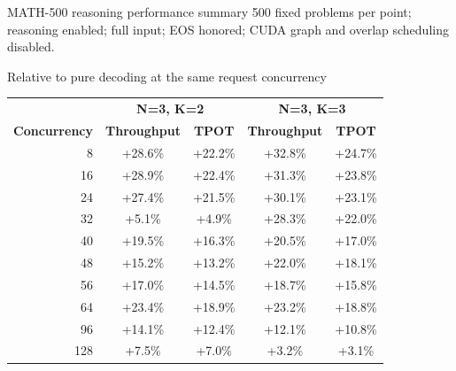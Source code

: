 \documentclass[aspectratio=169]{beamer}
\begin{document}
\begin{frame}{MATH-500 reasoning performance summary}
  \centering
  {\small 500 fixed problems per point; reasoning enabled; full input; EOS honored;
  CUDA graph and overlap scheduling disabled.}

  \vspace{0.08cm}
  {\scriptsize Relative to pure decoding at the same request concurrency
  \renewcommand{\arraystretch}{1.03}
  \begin{tabular}{rcc|cc}
    \hline
    & \multicolumn{2}{c|}{\textbf{N=3, K=2}} &
      \multicolumn{2}{c}{\textbf{N=3, K=3}} \\
    \textbf{Concurrency} & \textbf{Throughput} & \textbf{TPOT} &
      \textbf{Throughput} & \textbf{TPOT} \\
    \hline
    8   & \textcolor{green!45!black}{+28.6\%} & \textcolor{green!45!black}{+22.2\%} & \textcolor{green!45!black}{+32.8\%} & \textcolor{green!45!black}{+24.7\%} \\
    16  & \textcolor{green!45!black}{+28.9\%} & \textcolor{green!45!black}{+22.4\%} & \textcolor{green!45!black}{+31.3\%} & \textcolor{green!45!black}{+23.8\%} \\
    24  & \textcolor{green!45!black}{+27.4\%} & \textcolor{green!45!black}{+21.5\%} & \textcolor{green!45!black}{+30.1\%} & \textcolor{green!45!black}{+23.1\%} \\
    32  & \textcolor{green!45!black}{+5.1\%}  & \textcolor{green!45!black}{+4.9\%}  & \textcolor{green!45!black}{+28.3\%} & \textcolor{green!45!black}{+22.0\%} \\
    40  & \textcolor{green!45!black}{+19.5\%} & \textcolor{green!45!black}{+16.3\%} & \textcolor{green!45!black}{+20.5\%} & \textcolor{green!45!black}{+17.0\%} \\
    48  & \textcolor{green!45!black}{+15.2\%} & \textcolor{green!45!black}{+13.2\%} & \textcolor{green!45!black}{+22.0\%} & \textcolor{green!45!black}{+18.1\%} \\
    56  & \textcolor{green!45!black}{+17.0\%} & \textcolor{green!45!black}{+14.5\%} & \textcolor{green!45!black}{+18.7\%} & \textcolor{green!45!black}{+15.8\%} \\
    64  & \textcolor{green!45!black}{+23.4\%} & \textcolor{green!45!black}{+18.9\%} & \textcolor{green!45!black}{+23.2\%} & \textcolor{green!45!black}{+18.8\%} \\
    96  & \textcolor{green!45!black}{+14.1\%} & \textcolor{green!45!black}{+12.4\%} & \textcolor{green!45!black}{+12.1\%} & \textcolor{green!45!black}{+10.8\%} \\
    128 & \textcolor{green!45!black}{+7.5\%}  & \textcolor{green!45!black}{+7.0\%}  & \textcolor{green!45!black}{+3.2\%}  & \textcolor{green!45!black}{+3.1\%} \\
    \hline
  \end{tabular}}


\end{frame}
\end{document}
